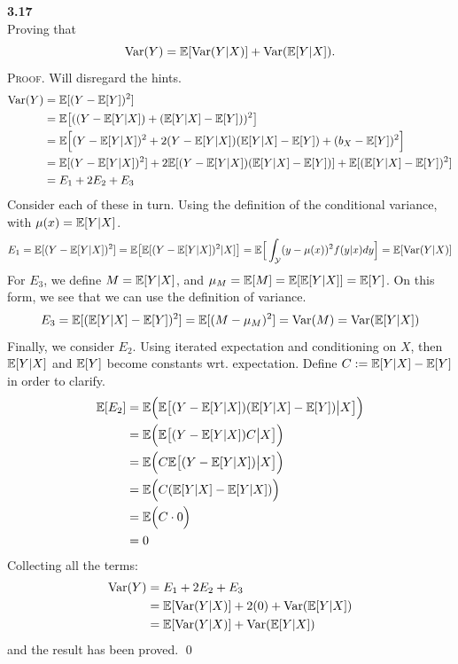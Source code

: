 \newpage\noindent
\textbf{3.17}\\  %
Proving that
$$
\text{Var}(Y) = \mathbb{E}[\text{Var}(Y|X)] + \text{Var}(\mathbb{E}[Y|X]).
$$
\textsc{Proof}. Will disregard the hints.
\begin{align*}
    \text{Var}(Y) &= \mathbb{E}[(Y - \mathbb{E}[Y])^2] \\
    &= \mathbb{E}\big[((Y - \mathbb{E}[Y|X]) + (\mathbb{E}[Y|X]- \mathbb{E}[Y]))^2\big] \\
    &= \mathbb{E}\Big[(Y - \mathbb{E}[Y|X])^2 + 2(Y - \mathbb{E}[Y|X])(\mathbb{E}[Y|X] - \mathbb{E}[Y]) + (b_X - \mathbb{E}[Y])^2\Big] \\
    &= \mathbb{E}[(Y - \mathbb{E}[Y|X])^2] + 2\mathbb{E}[(Y - \mathbb{E}[Y|X])(\mathbb{E}[Y|X] - \mathbb{E}[Y])] + \mathbb{E}[(\mathbb{E}[Y|X] - \mathbb{E}[Y])^2] \\
    &= E_1 + 2E_2 + E_3
\end{align*}
Consider each of these in turn. Using the definition of the conditional variance,
with $\mu(x) = \mathbb{E}[Y|X]$.
$$
E_1 = \mathbb{E}[(Y - \mathbb{E}[Y|X])^2] = \mathbb{E}\big[\mathbb{E}[(Y - \mathbb{E}[Y|X])^2|X]\big]
= \mathbb{E}\Big[\int_{\mathcal{Y}}(y - \mu(x))^2f(y|x)dy\Big] = \mathbb{E}[\text{Var}(Y|X)]
$$
For $E_3$, we define $M = \mathbb{E}[Y|X]$, and $\mu_M = \mathbb{E}[M] = \mathbb{E}[\mathbb{E}[Y|X]] = \mathbb{E}[Y]$.
On this form, we see that we can use the definition of variance.
$$
E_3 = \mathbb{E}[(\mathbb{E}[Y|X] - \mathbb{E}[Y])^2] = \mathbb{E}[(M - \mu_M)^2] = \text{Var}(M) = \text{Var}(\mathbb{E}[Y|X])
$$
Finally, we consider $E_2$. Using iterated expectation and conditioning on $X$,
then $\mathbb{E}[Y|X]$ and $\mathbb{E}[Y]$ become constants wrt. expectation. Define
$C := \mathbb{E}[Y|X] - \mathbb{E}[Y]$ in order to clarify.
\begin{align*}
    \mathbb{E}[E_2] &= \mathbb{E}\Big(\mathbb{E}\big[ (Y - \mathbb{E}[Y|X])(\mathbb{E}[Y|X] - \mathbb{E}[Y]) \big|X\big]\Big) \\
    &= \mathbb{E}\Big(\mathbb{E}\big[ (Y - \mathbb{E}[Y|X])C \big|X\big]\Big) \\
    &= \mathbb{E}\Big(C\mathbb{E}\big[ (Y - \mathbb{E}[Y|X]) \big|X\big]\Big) \\
    &= \mathbb{E}\Big(C(\mathbb{E}[Y|X] - \mathbb{E}[Y|X])\Big) \\
    &= \mathbb{E}\Big(C\cdot0\Big) \\
    &= 0
\end{align*}
Collecting all the terms:
\begin{align*}
    \text{Var}(Y) &= E_1 + 2E_2 + E_3 \\
    &= \mathbb{E}[\text{Var}(Y|X)] + 2(0) + \text{Var}(\mathbb{E}[Y|X])\\
    &= \mathbb{E}[\text{Var}(Y|X)] + \text{Var}(\mathbb{E}[Y|X])
\end{align*}
and the result has been proved. \qed

